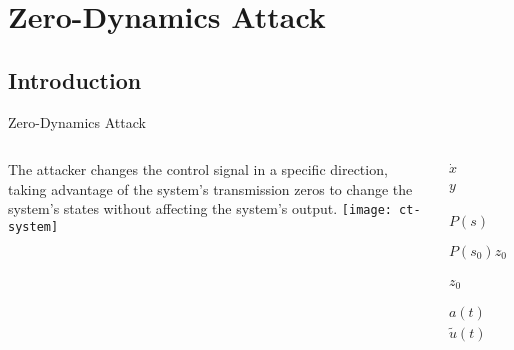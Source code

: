 
\section{Zero-Dynamics Attack}%
\label{sec:zda}

\subsection{Introduction}%
\label{subsec:ts-introduction}

\begin{slide}{Zero-Dynamics Attack}
  \begin{columns}[c]
    \begin{column}{0.48\textwidth}
      The attacker changes the control signal in a specific direction, taking
      advantage of the system's transmission zeros to change the system's states
      without affecting the system's output.
      \texttt{[image: ct-system]}
    \end{column}%
    \hfill%
    \begin{column}{0.48\textwidth}
      \begin{align}
        \dot{x}       & = Ax + Bu                                       \\
        y             & = Cx + Du                                       \\
        \nonumber                                                       \\
        P(s)          & = \begin{bmatrix}
                            sI-A & -B \\
                            C    & D
                          \end{bmatrix},                                \\
        P(s_{0})z_{0} & = 0.                                            \\
        z_{0}         & = \begin{bmatrix} x_{0} \\ a_{0} \end{bmatrix}, \\
        a(t)          & = a_{0}e^{s_{0}t},                              \\
        \tilde{u}(t)  & =u(t) + a(t).
      \end{align}
    \end{column}%
  \end{columns}
\end{slide}


